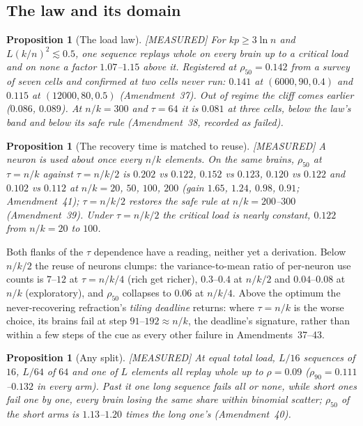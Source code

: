 \documentclass[11pt]{article}
\theoremstyle{definition}
\theoremstyle{plain}
\newtheorem{proposition}[lemma]{Proposition}
\newcommand{\MEASURED}{\textnormal{\footnotesize\textsf{[MEASURED]}}}
\begin{document}
\subsection{The law and its domain}

\begin{proposition}[The load law]\label{prop:loadlaw} \MEASURED
For $kp \ge 3\ln n$ and $L(k/n)^2 \lesssim 0.5$, one sequence replays whole on
every brain up to a critical load and on none a factor $1.07$--$1.15$ above it.
Registered at $\rho_{50} = 0.142$ from a survey of seven cells and confirmed at
two cells never run: $0.141$ at $(6000,90,0.4)$ and $0.115$ at $(12000,80,0.5)$
(Amendment~37). Out of regime the cliff comes earlier ($0.086$, $0.089$).
At $n/k = 300$ and $\tau = 64$ it is $0.081$ at three cells, below the law's
band and below its safe rule (Amendment~38, recorded as failed).
\end{proposition}

\begin{proposition}[The recovery time is matched to reuse]\label{prop:tau} \MEASURED
A neuron is used about once every $n/k$ elements. On the same brains,
$\rho_{50}$ at $\tau = n/k$ against $\tau = n/k/2$ is $0.202$ vs $0.122$,
$0.152$ vs $0.123$, $0.120$ vs $0.122$ and $0.102$ vs $0.112$ at $n/k = 20$, $50$,
$100$, $200$ (gain $1.65$, $1.24$, $0.98$, $0.91$; Amendment~41); $\tau = n/k/2$
restores the safe rule at $n/k = 200$--$300$ (Amendment~39). Under $\tau = n/k/2$
the critical load is nearly constant, $0.122$ from $n/k = 20$ to $100$.
\end{proposition}

Both flanks of the $\tau$ dependence have a reading, neither yet a derivation.
Below $n/k/2$ the reuse of neurons clumps: the variance-to-mean ratio of
per-neuron use counts is $7$--$12$ at $\tau = n/k/4$ (rich get richer), $0.3$--$0.4$ at
$n/k/2$ and $0.04$--$0.08$ at $n/k$ (exploratory), and $\rho_{50}$ collapses to
$0.06$ at $n/k/4$. Above the optimum the never-recovering refraction's
\emph{tiling deadline} returns: where $\tau = n/k$ is the worse choice, its
brains fail at step $91$--$192 \approx n/k$, the deadline's signature, rather
than within a few steps of the cue as every other failure in Amendments~37--43.

\begin{proposition}[Any split]\label{prop:split} \MEASURED
At equal total load, $L/16$ sequences of $16$, $L/64$ of $64$ and one of $L$
elements all replay whole up to $\rho = 0.09$ ($\rho_{90} = 0.111$--$0.132$ in
every arm). Past it one long sequence fails all or none, while short ones fail
one by one, every brain losing the same share within binomial scatter;
$\rho_{50}$ of the short arms is $1.13$--$1.20$ times the long one's
(Amendment~40).
\end{proposition}
\end{document}
